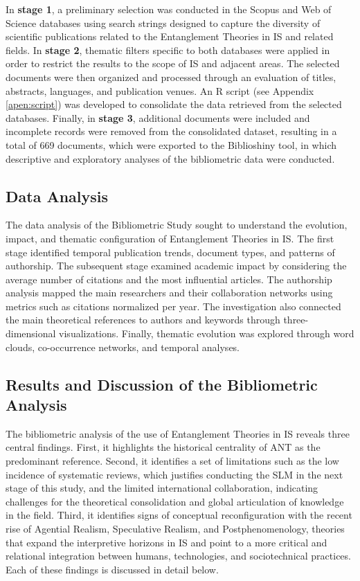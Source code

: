 In \textbf{stage 1}, a preliminary selection was conducted in the Scopus and Web of Science databases using search strings designed to capture the diversity of scientific publications related to the Entanglement Theories in IS and related fields. In \textbf{stage 2}, thematic filters specific to both databases were applied in order to restrict the results to the scope of IS and adjacent areas. The selected documents were then organized and processed through an evaluation of titles, abstracts, languages, and publication venues. An R script (see Appendix \ref{apen:script}) was developed to consolidate the data retrieved from the selected databases. Finally, in \textbf{stage 3}, additional documents were included and incomplete records were removed from the consolidated dataset, resulting in a total of 669 documents, which were exported to the Biblioshiny tool, in which descriptive and exploratory analyses of the bibliometric data were conducted.




\subsection{Data Analysis}

The data analysis of the Bibliometric Study sought to understand the evolution, impact, and thematic configuration of Entanglement Theories in IS. The first stage identified temporal publication trends, document types, and patterns of authorship. The subsequent stage examined academic impact by considering the average number of citations and the most influential articles. The authorship analysis mapped the main researchers and their collaboration networks using metrics such as citations normalized per year. The investigation also connected the main theoretical references to authors and keywords through three-dimensional visualizations. Finally, thematic evolution was explored through word clouds, co-occurrence networks, and temporal analyses.

\subsection{Results and Discussion of the Bibliometric Analysis}\label{sec:resultados_discussao_bibliometria}

The bibliometric analysis of the use of Entanglement Theories in IS reveals three central findings. First, it highlights the historical centrality of ANT as the predominant reference. Second, it identifies a set of limitations such as the low incidence of systematic reviews, which justifies conducting the SLM in the next stage of this study, and the limited international collaboration, indicating challenges for the theoretical consolidation and global articulation of knowledge in the field. Third, it identifies signs of conceptual reconfiguration with the recent rise of Agential Realism, Speculative Realism, and Postphenomenology, theories that expand the interpretive horizons in IS and point to a more critical and relational integration between humans, technologies, and sociotechnical practices. Each of these findings is discussed in detail below.

